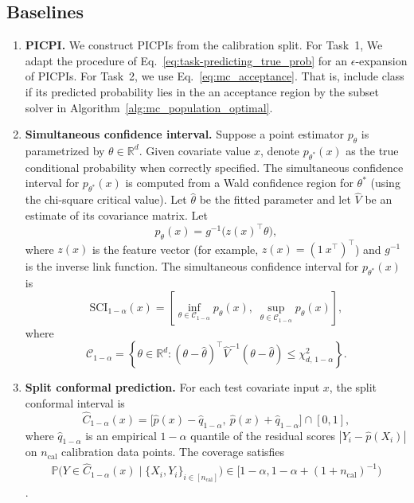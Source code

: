 \documentclass[11pt]{article}
\theoremstyle{statplain}
\theoremstyle{statdefinition}
\newcommand{\PP}{\mathbb{P}}
\newcommand{\0}{\mathbf{0}}
\newcommand{\titleShort}{PICPI\xspace}
\newcommand{\titleShorts}{PICPIs\xspace}
\begin{document}
\subsection{Baselines}
\label{app:baselines}
\begin{enumerate}
\item \textbf{\titleShort.} We construct \titleShorts from the calibration split. For Task~1, We adapt the procedure of Eq.~\eqref{eq:task-predicting_true_prob} for an $\epsilon$-expansion of \titleShorts.  For Task~2, we use Eq.~\eqref{eq:mc_acceptance}. That is, include class if its predicted probability lies in the an acceptance region by the subset solver in Algorithm~\ref{alg:mc_population_optimal}.

\item \textbf{Simultaneous confidence interval.}
Suppose a point estimator $p_{\theta}$ is parametrized by $\theta \in \mathbb{R}^d$. 
Given covariate value $x$, denote $p_{\theta^*}(x)$ as the true conditional probability when correctly specified. The simultaneous confidence interval for $p_{\theta^*}(x)$ is computed from a Wald confidence region for $\theta^*$ (using the chi-square critical value).
Let $\hat{\theta}$ be the fitted parameter and let $\widehat V$ be an estimate of its covariance matrix.
Let
\[
p_\theta(x) = g^{-1}\!\bigl(z(x)^\top \theta\bigr),
\]
where $z(x)$ is the feature vector (for example, $z(x) = (1~x^\top)^\top$) and $g^{-1}$ is the inverse link function. 
The simultaneous confidence interval for $p_{\theta^*}(x)$ is
\[
\mathrm{SCI}_{1-\alpha}(x)
=
\left[
\inf_{\theta \in \mathcal C_{1-\alpha}} p_\theta(x),
\;
\sup_{\theta \in \mathcal C_{1-\alpha}} p_\theta(x)
\right],
\]
where 
\[
\mathcal C_{1-\alpha}
=
\left\{
\theta \in \mathbb{R}^d :
(\theta-\hat\theta)^\top \widehat V^{-1}(\theta-\hat\theta)
\le \chi^2_{d,\,1-\alpha}
\right\}.
\]

\item \textbf{Split conformal prediction.} For each test covariate input $x$, the split conformal interval is 
\[
\widehat C_{1-\alpha}(x)
=
\bigl[\hat p(x)-\hat q_{1-\alpha},\ \hat p(x)+\hat q_{1-\alpha}\bigr]\cap[0,1],
\]
where $\hat q_{1-\alpha}$ is an empirical $1-\alpha$ quantile of the residual scores $|Y_i-\hat p(X_i)|$ on $n_\mathrm{cal}$ calibration data points. The coverage satisfies
\begin{align}\label{eq:conformal_tp}
\PP\Big(Y \in \widehat C_{1-\alpha}(x) \mid \{X_i, Y_i\}_{i\in [n_\mathrm{cal}]}\Big) \in \Big[1-\alpha,1-\alpha+(1+n_\mathrm{cal})^{-1}\Big)
\end{align}
\citep{papadopoulos2002inductive}.


\end{enumerate}
\end{document}

